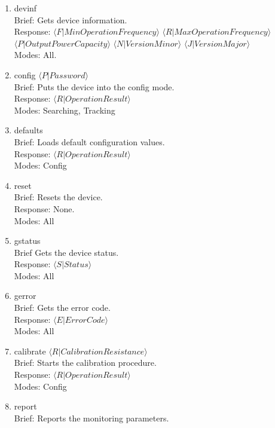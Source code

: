 \documentclass{article}
\begin{document}
\begin{enumerate}
      \item devinf
            \\ Brief: Gets device information.
            \\ Response: $\langle F|MinOperationFrequency \rangle$ $\langle R|MaxOperationFrequency \rangle$
            $\langle P|OutputPowerCapacity \rangle$ $\langle N|VersionMinor \rangle$ $\langle J|VersionMajor \rangle$
            \\ Modes: All. 
      \item config $\langle P|Password \rangle$
            \\ Brief: Puts the device into the config mode.
            \\ Response: $\langle R|OperationResult \rangle$
            \\ Modes: Searching, Tracking
      \item defaults
            \\ Brief: Loads default configuration values.
            \\ Response: $\langle R|OperationResult \rangle$
            \\ Modes: Config
      \item reset
            \\ Brief: Resets the device.
            \\ Response: None.
            \\ Modes: All
      \item gstatus
            \\ Brief Gets the device status.
            \\ Response: $\langle S|Status \rangle$
            \\ Modes: All
      \item gerror
            \\ Brief: Gets the error code.
            \\ Response: $\langle E|ErrorCode \rangle$
            \\ Modes: All
      \item calibrate $\langle R|CalibrationResistance \rangle$
            \\ Brief: Starts the calibration procedure.
            \\ Response: $\langle R|OperationResult \rangle$
            \\ Modes: Config
      \item report
            \\ Brief: Reports the monitoring parameters.

\end{enumerate}
\end{document}
